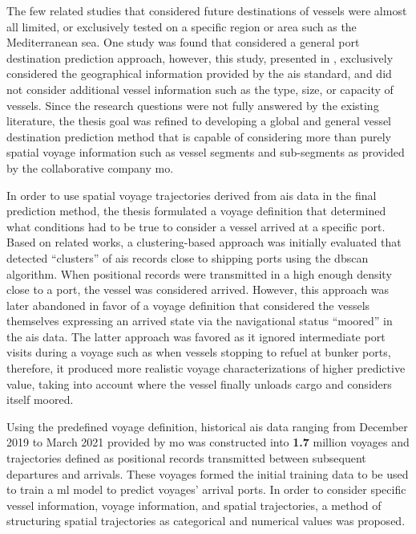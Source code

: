 The few related studies that considered future destinations of vessels were almost all limited, or exclusively tested on a specific region or area such as the Mediterranean sea. One study was found that considered a general port destination prediction approach, however, this study, presented in \cite{Zhang2020AISApproach}, exclusively considered the geographical information provided by the \acrshort{ais} standard, and did not consider additional vessel information such as the type, size, or capacity of vessels. Since the research questions were not fully answered by the existing literature, the thesis goal was refined to developing a global and general vessel destination prediction method that is capable of considering more than purely spatial voyage information such as vessel segments and sub-segments as provided by the collaborative company \acrfull{mo}.

In order to use spatial voyage trajectories derived from \acrshort{ais} data in the final prediction method, the thesis formulated a voyage definition that determined what conditions had to be true to consider a vessel arrived at a specific port. Based on related works, a clustering-based approach was initially evaluated that detected ``clusters'' of \acrshort{ais} records close to shipping ports using the \acrfull{dbscan} algorithm. When positional records were transmitted in a high enough density close to a port, the vessel was considered arrived. However, this approach was later abandoned in favor of a voyage definition that considered the vessels themselves expressing an arrived state via the navigational status ``moored'' in the \acrshort{ais} data. The latter approach was favored as it ignored intermediate port visits during a voyage such as when vessels stopping to refuel at bunker ports, therefore, it produced more realistic voyage characterizations of higher predictive value, taking into account where the vessel finally unloads cargo and considers itself moored.

Using the predefined voyage definition, historical \acrshort{ais} data ranging from December 2019 to March 2021 provided by \acrshort{mo} was constructed into \textbf{1.7} million voyages and trajectories defined as positional records transmitted between subsequent departures and arrivals. These voyages formed the initial training data to be used to train a \acrfull{ml} model to predict voyages' arrival ports. In order to consider specific vessel information, voyage information, and spatial trajectories, a method of structuring spatial trajectories as categorical and numerical values was proposed.


